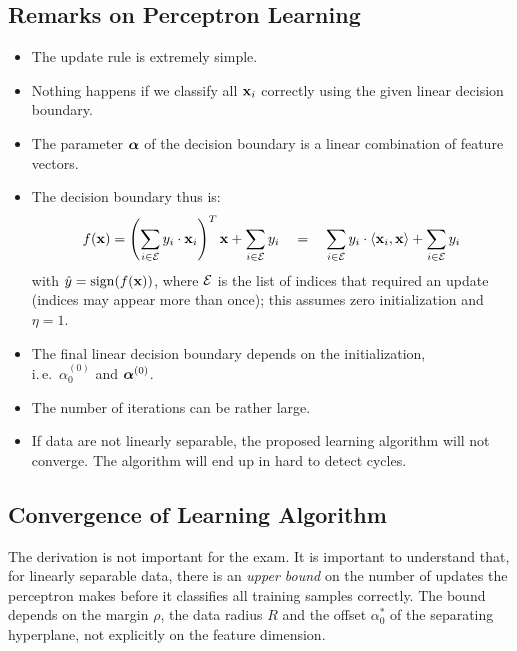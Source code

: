 \subsection{Remarks on Perceptron Learning}

  \begin{itemize}
    \item The update rule is extremely simple. \\[.3cm]
    \item Nothing happens if we classify all $\bm{\mathrm{x}}_i$ correctly using the given linear decision boundary. 
    \item The parameter $\bm{\mathrm{\alpha}}$ of the decision boundary is a linear combination of feature vectors. 
    \item The decision boundary thus is:
    \begin{displaymath}
       f(\bm{\mathrm{x}}) = \left (\sum_{i\in \cal E} y_i\cdot \bm{\mathrm{x}}_i \right)^T \bm{\mathrm{x}} + \sum_{i\in \cal E} y_i \quad 
                 = \quad \sum_{i\in \cal E} y_i\cdot \langle \bm{\mathrm{x}}_i, \bm{\mathrm{x}}\rangle + \sum_{i\in \cal E} y_i 
    \end{displaymath}
    with $\hat y=\operatorname{sign}(f(\bm{\mathrm{x}}))$, where $\cal E$ is the list of indices that required an update (indices may appear more than once); this assumes zero initialization and $\eta=1$. 
    \item The final linear decision boundary depends on the initialization, \\
      i.\,e.\ $\alpha_0^{(0)}$ and $\bm{\mathrm{\alpha}}^{(0)}$. 
    \item The number of iterations can be rather large. 
    \item If data are not linearly separable, the proposed learning algorithm will not converge. The algorithm will end up in hard to detect cycles.
  \end{itemize}

\subsection{Convergence of Learning Algorithm}

The derivation is not important for the exam. It is important to understand that, for linearly separable data, there is an \emph{upper bound} on the number of updates the perceptron makes before it classifies all training samples correctly. The bound depends on the margin $\rho$, the data radius $R$ and the offset $\alpha_0^*$ of the separating hyperplane, not explicitly on the feature dimension. 

